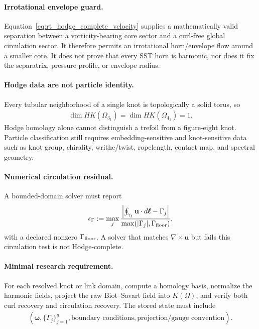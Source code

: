     \paragraph{Irrotational envelope guard.}
    Equation~\eqref{eq:rt_hodge_complete_velocity} supplies a mathematically valid
    separation between a vorticity-bearing core sector and a curl-free global
    circulation sector.  It therefore permits an irrotational horn/envelope flow
    around a smaller core.  It does not prove that every SST horn is harmonic, nor
    does it fix the separatrix, pressure profile, or envelope radius.

    \paragraph{Hodge data are not particle identity.}
    Every tubular neighborhood of a single knot is topologically a solid torus, so
    \begin{align}
        \dim HK(\Omega_{3_1})
        =
        \dim HK(\Omega_{4_1})
        =1.
        \label{eq:rt_hodge_not_knot_classifier}
    \end{align}
    Hodge homology alone cannot distinguish a trefoil from a figure-eight knot.
    Particle classification still requires embedding-sensitive and knot-sensitive
    data such as knot group, chirality, writhe/twist, ropelength, contact map, and
    spectral geometry.

    \paragraph{Numerical circulation residual.}
    A bounded-domain solver must report
    \begin{align}
        \epsilon_{\Gamma}
        :=
        \max_j
        \frac{
        \left|
        \oint_{\gamma_j}\mathbf u\cdot d\boldsymbol\ell-\Gamma_j
        \right|
        }{
        \max(|\Gamma_j|,\Gamma_{\rm floor})
        },
        \label{eq:rt_hodge_circulation_residual}
    \end{align}
    with a declared nonzero \(\Gamma_{\rm floor}\).  A solver that matches
    \(\nabla\times\mathbf u\) but fails this circulation test is not Hodge-complete.

    \paragraph{Minimal research requirement.}
    For each resolved knot or link domain, compute a homology basis, normalize the
    harmonic fields, project the raw Biot--Savart field into \(K(\Omega)\), and verify
    both curl recovery and circulation recovery.  The stored state must include
    \begin{align}
        \left(
        \boldsymbol\omega,
        \{\Gamma_j\}_{j=1}^{g},
        \text{boundary conditions},
        \text{projection/gauge convention}
        \right).
        \label{eq:rt_hodge_state_metadata}
    \end{align}

